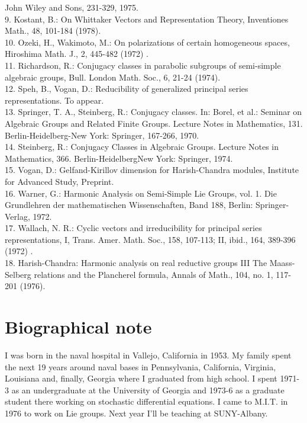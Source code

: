 \documentclass[10pt]{article}
\begin{document}
John Wiley and Sons, 231-329, 1975.\\
9. Kostant, B.: On Whittaker Vectors and Representation Theory, Inventiones Math., 48, 101-184 (1978).\\
10. Ozeki, H., Wakimoto, M.: On polarizations of certain homogeneous spaces, Hiroshima Math. J., 2, 445-482 (1972) .\\
11. Richardson, R.: Conjugacy classes in parabolic subgroups of semi-simple algebraic groups, Bull. London Math. Soc., 6, 21-24 (1974).\\
12. Speh, B., Vogan, D.: Reducibility of generalized principal series representations. To appear.\\
13. Springer, T. A., Steinberg, R.: Conjugacy classes. In: Borel, et al.: Seminar on Algebraic Groups and Related Finite Groups. Lecture Notes in Mathematics, 131. Berlin-Heidelberg-New York: Springer, 167-266, 1970.\\
14. Steinberg, R.: Conjugacy Classes in Algebraic Groups. Lecture Notes in Mathematics, 366. Berlin-HeidelbergNew York: Springer, 1974.\\
15. Vogan, D.: Gelfand-Kirillov dimension for Harish-Chandra modules, Institute for Advanced Study, Preprint.\\
16. Warner, G.: Harmonic Anałysis on Semi-Simple Lie Groups, vol. 1. Die Grundlehren der mathematischen Wissenschaften, Band 188, Berlin: Springer-Verlag, 1972.\\
17. Wallach, N. R.: Cyclic vectors and irreducibility for principal series representations, I, Trans. Amer. Math. Soc., 158, 107-113; II, ibid., 164, 389-396 (1972) .\\
18. Harish-Chandra: Harmonic analysis on real reductive groups III The Maass-Selberg relations and the Plancherel formula, Annals of Math., 104, no. 1, 117-201 (1976).

\section{Biographical note}
I was born in the naval hospital in Vallejo, California in 1953. My family spent the next 19 years around naval bases in Pennsylvania, California, Virginia, Louisiana and, finally, Georgia where I graduated from high school. I spent 1971-3 as an undergraduate at the University of Georgia and 1973-6 as a graduate student there working on stochastic differential equations. I came to M.I.T. in 1976 to work on Lie groups. Next year I'll be teaching at SUNY-Albany.
\end{document}
